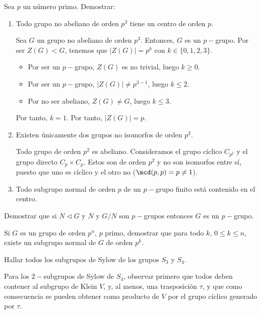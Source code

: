 \begin{ejercicio}\label{ej:6.17}
    Sea $p$ un número primo. Demostrar:
    \begin{enumerate}
        \item Todo grupo no abeliano de orden $p^3$ tiene un centro de orden $p$.
        
        Sea $G$ un grupo no abeliano de orden $p^3$. Entonces, $G$ es un $p-$grupo. Por ser $Z(G)<G$, tenemos que $|Z(G)|=p^k$ con $k\in \{0,1,2,3\}$.
        \begin{itemize}
            \item Por ser un $p-$grupo, $Z(G)$ es no trivial, luego $k\geq 0$.
            \item Por ser un $p-$grupo, $|Z(G)|\neq p^{3-1}$, luego $k\leq 2$.
            \item Por no ser abeliano, $Z(G)\neq G$, luego $k\leq 3$.
        \end{itemize}
        Por tanto, $k=1$. Por tanto, $|Z(G)|=p$.
        \item Existen únicamente dos grupos no isomorfos de orden $p^2$.
        
        Todo grupo de orden $p^2$ es abeliano. Consideramos el grupo cíclico $C_{p^2}$ y el grupo directo $C_p\times C_p$. Estos son de orden $p^2$ y no son isomorfos entre sí, puesto que uno es cíclico y el otro no ($\mcd(p,p)=p\neq 1$).

        \item Todo subgrupo normal de orden $p$ de un $p-$grupo finito está contenido en el centro.
    \end{enumerate}
\end{ejercicio}

\begin{ejercicio}\label{ej:6.18}
    Demostrar que si $N\lhd G$ y $N$ y $G/N$ son $p-$grupos entonces $G$ es un $p-$grupo.
\end{ejercicio}

\begin{ejercicio}\label{ej:6.19}
    Si $G$ es un grupo de orden $p^n$, $p$ primo, demostrar que para todo $k$, $0 \leq k \leq n$, existe un subgrupo normal de $G$ de orden $p^k$.
\end{ejercicio}

\begin{ejercicio}\label{ej:6.20}
    Hallar todos los subgrupos de Sylow de los grupos $S_3$ y $S_4$.
    \begin{observacion}
        Para los $2-$subgrupos de Sylow de $S_4$, observar primero que todos deben contener al subgrupo de Klein $V$, y, al menos, una trasposición $\tau$, y que como consecuencia se pueden obtener como producto de $V$ por el grupo cíclico generado por $\tau$.
    \end{observacion}
\end{ejercicio}

